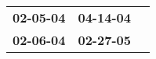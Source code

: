 \begin{supertabular}{p{0.33\columnwidth}p{0.33\columnwidth}p{0.33\columnwidth}}
 \textbf{02-05-04\textsuperscript{}} &  \textbf{04-14-04\textsuperscript{}} \\
 \textbf{02-06-04\textsuperscript{}} &  \textbf{02-27-05\textsuperscript{}} \\
\end{supertabular}
